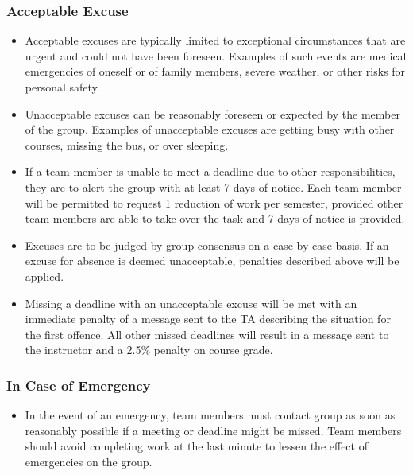 \documentclass{article}
\begin{document}
\subsubsection*{Acceptable Excuse}

\begin{itemize}
\item Acceptable excuses are typically limited to exceptional circumstances that are urgent and could not have been foreseen. Examples of such events are medical emergencies of oneself or of family members, 
severe weather, or other risks for personal safety.
\item Unacceptable excuses can be reasonably foreseen or expected by the member of the group. Examples of unacceptable excuses are getting busy with other courses, missing the bus, or over sleeping.
\item If a team member is unable to meet a deadline due to other responsibilities, they are to alert the group with at least 7 days of notice. Each team member will
be permitted to request 1 reduction of work per semester, provided other team members are able to take over the task and 7 days of notice is provided.
\item Excuses are to be judged by group consensus on a case by case basis. If an excuse for absence is deemed unacceptable, penalties described above will be applied.
\item Missing a deadline with an unacceptable excuse will be met with an immediate penalty of a message sent to the TA describing the situation for the first offence. 
All other missed deadlines will result in a message sent to the instructor and a 2.5\% penalty on course grade.
\end{itemize}

\subsubsection*{In Case of Emergency}
\begin{itemize}
  \item In the event of an emergency, team members must contact group as soon as reasonably possible if a meeting or deadline might be missed. Team members should avoid
  completing work at the last minute to lessen the effect of emergencies on the group.
  \end{itemize}
\end{document}
